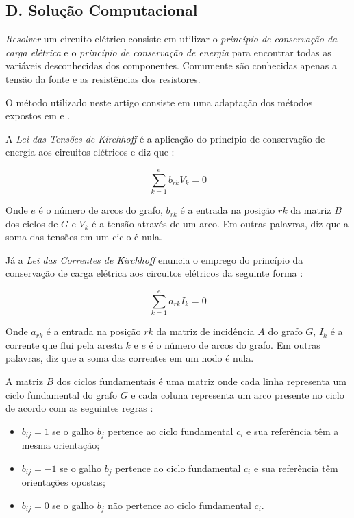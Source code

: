 \documentclass[twocolumn, 10pt]{extarticle}
\begin{document}
\subsection*{D. \quad Solução Computacional}

\textit{Resolver} um circuito elétrico consiste em utilizar o \textit{princípio de conservação da carga elétrica} e o \textit{princípio de conservação de energia} para encontrar todas as variáveis desconhecidas dos componentes. Comumente são conhecidas apenas a tensão da fonte e as resistências dos resistores.

O método utilizado neste artigo consiste em uma adaptação dos métodos expostos em \cite{krishna} e \cite{boruah}.

A \textit{Lei das Tensões de Kirchhoff} é a aplicação do princípio de conservação de energia aos circuitos elétricos e diz que \cite[p. 945]{boruah}:

\[
\sum_{k=1}^{e} b_{rk}V_k = 0
\]

Onde $e$ é o número de arcos do grafo, $b_{rk}$ é a entrada na posição $rk$ da matriz $B$ dos ciclos de $G$ e $V_k$ é a tensão através de um arco. Em outras palavras, diz que a soma das tensões em um ciclo é nula.

Já a \textit{Lei das Correntes de Kirchhoff} enuncia o emprego do princípio da conservação de carga elétrica aos circuitos elétricos da seguinte forma \cite[p. 945]{boruah}:

\[
\sum_{k=1}^{e} a_{rk}I_k = 0
\]

Onde $a_{rk}$ é a entrada na posição $rk$ da matriz de incidência $A$ do grafo $G$, $I_k$ é a corrente que flui pela aresta $k$ e $e$ é o número de arcos do grafo. Em outras palavras, diz que a soma das correntes em um nodo é nula.

A matriz $B$ dos ciclos fundamentais é uma matriz onde cada linha representa um ciclo fundamental do grafo $G$ e cada coluna representa um arco presente no ciclo de acordo com as seguintes regras \cite[p. 948]{boruah}:

\begin{itemize}
	\item $b_{ij} = 1$ se o galho $b_j$ pertence ao ciclo fundamental $c_i$ e sua referência têm a mesma orientação;
	\item $b_{ij} = -1$ se o galho $b_j$ pertence ao  ciclo fundamental $c_i$ e sua referência têm orientações opostas;
	\item $b_{ij} = 0$ se o galho $b_j$ não pertence ao ciclo fundamental $c_i$.
\end{itemize}
\end{document}
